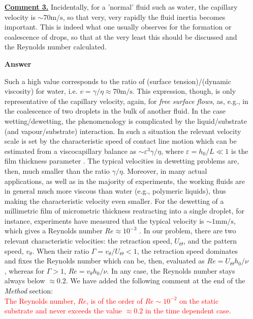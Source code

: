 \documentclass[12pt,english]{article}
\begin{document}
\begin{itemize}
{}

\item[ \textbf{\underline{Comment 3.}}]
{ 
Incidentally, for a 'normal' fluid such as water, the capillary velocity is $\sim 70\mbox{m}/\mbox{s}$, 
so that very, very rapidly the fluid inertia becomes important. 
This is indeed what one usually observes for the formation or coalescence of drops, so that at the very least this should be discussed and the Reynolds number calculated.
}

\item[ \textbf{{Answer}}]
{
Such a high value corresponds to the ratio of (surface tension)/(dynamic viscosity) for water, i.e. $v = \gamma/\eta \approx 70 \mbox{m}/\mbox{s}$.
This expression, though, is only representative of the capillary velocity, again, for {\it free surface flows}, as, e.g., in the coalescence of 
two droplets in the bulk of another fluid. 
In the case wetting/dewetting, 
the phenomenology is complicated by the liquid/substrate (and vapour/substrate) interaction. 
In such a situation the relevant velocity scale is set by the characteristic speed of contact line 
motion which can be estimated from a viscocapillary balance as 
$\sim \varepsilon^3 \gamma/\eta$, where $\varepsilon = h_0/L \ll 1$ is the film thickness parameter 
\cite{RevModPhys.69.931,doi:10.1146/annurev-fluid-011212-140734}. 
The typical velocities in dewetting problems are, then, much smaller than the ratio $\gamma/\eta$.
Moreover, in many actual applications, as well as in the majority of experiments, the 
working fluids are in general much more viscous than water (e.g., polymeric liquids), thus making
the characteristic velocity even smaller.
For the dewetting of a millimetric film of micrometric thickness reatracting into a single droplet, for instance, experiments have measured that 
the typical velocity is $\sim 1 \mbox{mm}/\mbox{s}$, which gives a Reynolds number $Re \approx 10^{-3}$ \cite{Edwards2016}. 
In our problem, there are two relevant characteristic velocities: the retraction speed, 
$U_{\Theta}$, and 
the pattern speed, $v_{\theta}$. When their ratio $\Gamma = v_{\theta}/U_{\Theta} < 1$, the retraction speed dominates and fixes the Reynolds number which can be, then, evaluated as 
$Re = U_{\Theta}h_0/\nu$ \cite{RevModPhys.69.931}, whereas for $\Gamma > 1$, $Re = v_{\theta} h_0/\nu$. 
In any case, the Reynolds number stays always below $\approx 0.2$.
We have added the following comment at the end of the {\it Method} section:\\

\textcolor{red}{The Reynolds number, $Re$, is of the order of $Re \sim 10^{-2}$ on the 
static substrate and never exceeds the value $\approx 0.2$ in the time dependent case.}

}
\end{itemize}
\end{document}
